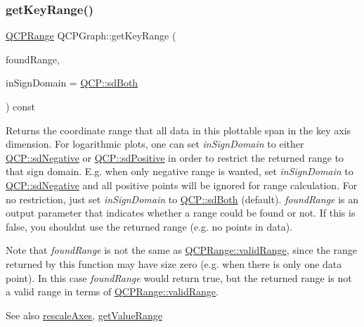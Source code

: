 \subsubsection{\texorpdfstring{get\+Key\+Range()}{getKeyRange()}}
{\footnotesize\ttfamily \hyperlink{classQCPRange}{Q\+C\+P\+Range} Q\+C\+P\+Graph\+::get\+Key\+Range (\begin{DoxyParamCaption}\item[{bool \&}]{found\+Range,  }\item[{\hyperlink{namespaceQCP_afd50e7cf431af385614987d8553ff8a9}{Q\+C\+P\+::\+Sign\+Domain}}]{in\+Sign\+Domain = {\ttfamily \hyperlink{namespaceQCP_afd50e7cf431af385614987d8553ff8a9aa38352ef02d51ddfa4399d9551566e24}{Q\+C\+P\+::sd\+Both}} }\end{DoxyParamCaption}) const\hspace{0.3cm}{\ttfamily [virtual]}}

Returns the coordinate range that all data in this plottable span in the key axis dimension. For logarithmic plots, one can set {\itshape in\+Sign\+Domain} to either \hyperlink{namespaceQCP_afd50e7cf431af385614987d8553ff8a9a2d18af0bc58f6528d1e82ce699fe4829}{Q\+C\+P\+::sd\+Negative} or \hyperlink{namespaceQCP_afd50e7cf431af385614987d8553ff8a9a584784b75fb816abcc627cf743bb699f}{Q\+C\+P\+::sd\+Positive} in order to restrict the returned range to that sign domain. E.\+g. when only negative range is wanted, set {\itshape in\+Sign\+Domain} to \hyperlink{namespaceQCP_afd50e7cf431af385614987d8553ff8a9a2d18af0bc58f6528d1e82ce699fe4829}{Q\+C\+P\+::sd\+Negative} and all positive points will be ignored for range calculation. For no restriction, just set {\itshape in\+Sign\+Domain} to \hyperlink{namespaceQCP_afd50e7cf431af385614987d8553ff8a9aa38352ef02d51ddfa4399d9551566e24}{Q\+C\+P\+::sd\+Both} (default). {\itshape found\+Range} is an output parameter that indicates whether a range could be found or not. If this is false, you shouldn\textquotesingle{}t use the returned range (e.\+g. no points in data).

Note that {\itshape found\+Range} is not the same as \hyperlink{classQCPRange_ab38bd4841c77c7bb86c9eea0f142dcc0}{Q\+C\+P\+Range\+::valid\+Range}, since the range returned by this function may have size zero (e.\+g. when there is only one data point). In this case {\itshape found\+Range} would return true, but the returned range is not a valid range in terms of \hyperlink{classQCPRange_ab38bd4841c77c7bb86c9eea0f142dcc0}{Q\+C\+P\+Range\+::valid\+Range}.

\begin{DoxySeeAlso}{See also}
\hyperlink{classQCPAbstractPlottable_a1491c4a606bccd2d09e65e11b79eb882}{rescale\+Axes}, \hyperlink{classQCPGraph_a8f773e56f191a61c06e129e90a604d77}{get\+Value\+Range} 
\end{DoxySeeAlso}


